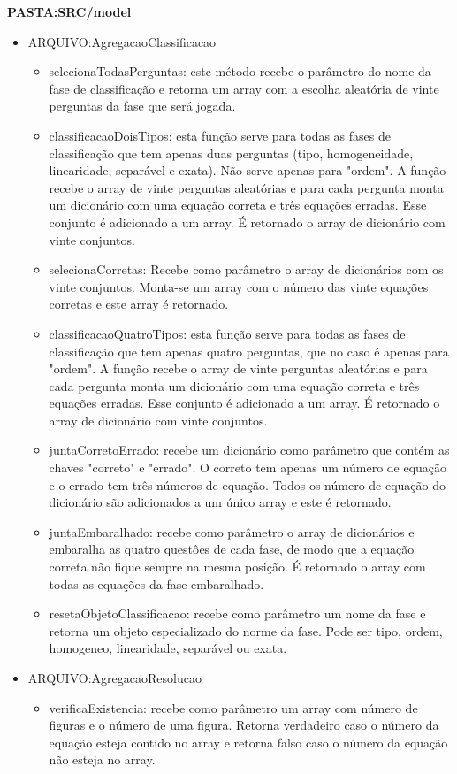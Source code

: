 \textbf{PASTA:SRC/model}
\begin{itemize}
	\item ARQUIVO:AgregacaoClassificacao
	\begin{itemize}
		\item selecionaTodasPerguntas: este método recebe o parâmetro do nome da fase de classificação e retorna um array com a escolha aleatória de vinte perguntas da fase que será jogada.
		\item classificacaoDoisTipos: esta função serve para todas as fases de classificação que tem apenas duas perguntas (tipo, homogeneidade, linearidade, separável e exata). Não serve apenas para "ordem". A função recebe o array de vinte perguntas aleatórias e para cada pergunta monta um dicionário com uma equação correta e três equações erradas. Esse conjunto é adicionado a um array. É retornado o array de dicionário com vinte conjuntos.
		\item selecionaCorretas: Recebe como parâmetro o array de dicionários com os vinte conjuntos. Monta-se um array com o número das vinte equações corretas e este array é retornado.  
		\item classificacaoQuatroTipos: esta função serve para todas as fases de classificação que tem apenas quatro perguntas, que no caso é apenas para "ordem". A função recebe o array de vinte perguntas aleatórias e para cada pergunta monta um dicionário com uma equação correta e três equações erradas. Esse conjunto é adicionado a um array. É retornado o array de dicionário com vinte conjuntos.
		\item juntaCorretoErrado: recebe um dicionário como parâmetro que contém as chaves "correto" e "errado". O correto tem apenas um número de equação e o errado tem três números de equação. Todos os número de equação do dicionário são adicionados a um único array e este é retornado. 
		\item  juntaEmbaralhado: recebe como parâmetro o array de dicionários e embaralha as quatro questôes de cada fase, de modo que a equação correta não fique sempre na mesma posição. É retornado o array com todas as equações da fase embaralhado.
		\item resetaObjetoClassificacao: recebe como parâmetro um nome da fase e retorna um objeto especializado do norme da fase. Pode ser tipo, ordem, homogeneo, linearidade, separável ou exata.
	\end{itemize}
\end{itemize}

\begin{itemize}
	\item ARQUIVO:AgregacaoResolucao
	\begin{itemize}
		\item verificaExistencia: recebe como parâmetro um array com número de figuras e o número de uma figura. Retorna verdadeiro caso o número da equação esteja contido no array e retorna falso caso o número da equação não esteja no array.
	\end{itemize}
\end{itemize}

